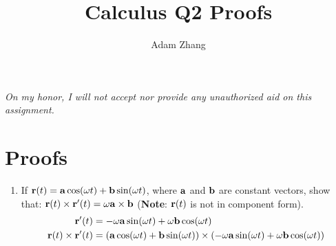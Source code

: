 \documentclass[11pt]{article}
\title{Calculus Q2 Proofs}
\author{Adam Zhang}
\renewcommand{\vec}[1]{\ensuremath\mathbf{#1}}
\begin{document}
\maketitle
\begin{center}
  \emph{On my honor, I will not accept nor provide any unauthorized aid on this assignment.}
\end{center}

\section*{Proofs}
\begin{enumerate}
\item If \(\vec{r}(t) = \vec{a}\cos(\omega t) + \vec{b}\sin(\omega t)\), where \(\vec{a}\) and \(\vec{b}\) are constant vectors, show that: \(\vec{r}(t) \times \vec{r} '(t) = \omega \vec{a} \times \vec{b}\) (\textbf{Note}: \(\vec{r}(t)\) is not in component form).
  \begin{align*}
    \vec{r}'(t) &= -\omega \vec{a}\sin(\omega t) + \omega \vec{b} \cos (\omega t) \\
    \vec{r}(t) \times \vec{r}'(t) &= \left( \vec{a} \cos(\omega t) + \vec{b} \sin(\omega t) \right) \times \left( -\omega \vec{a} \sin(\omega t) + \omega \vec{b} \cos(\omega t) \right) \\
  \end{align*}
\end{enumerate}
\end{document}
